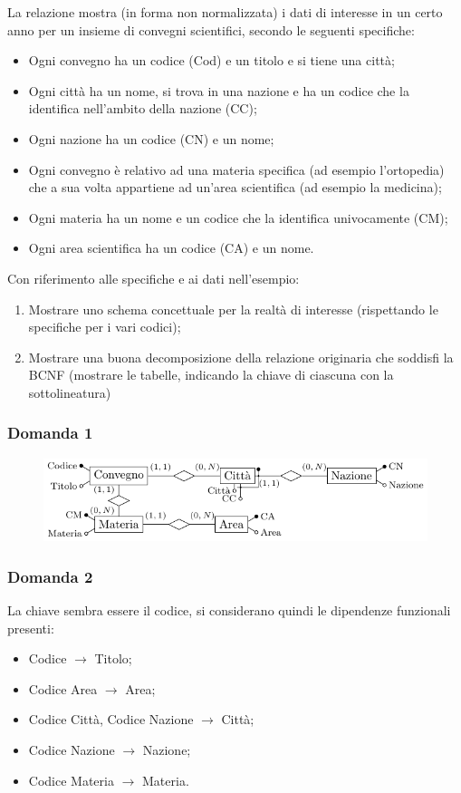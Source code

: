 \documentclass{article}
\numberwithin{equation}{subsection}
\begin{document}
La relazione mostra (in forma non normalizzata) i dati di interesse in un certo anno per un insieme di convegni
scientifici, secondo le seguenti specifiche:
\begin{itemize}
    \item Ogni convegno ha un codice (Cod) e un titolo e si tiene una città;
    \item Ogni città ha un nome, si trova in una nazione e ha un codice che la identifica nell'ambito della nazione (CC);
    \item Ogni nazione ha un codice (CN) e un nome;
    \item Ogni convegno è relativo ad una materia specifica (ad esempio l'ortopedia) che a sua volta appartiene
    ad un'area scientifica (ad esempio la medicina); 
    \item Ogni materia ha un nome e un codice che la identifica
    univocamente (CM);
    \item Ogni area scientifica ha un codice (CA) e un nome. 
\end{itemize}
Con riferimento alle specifiche e ai dati nell'esempio:
\begin{enumerate}
    \item Mostrare uno schema concettuale per la realtà di interesse (rispettando le specifiche per i vari codici);
    \item Mostrare una buona decomposizione della relazione originaria che soddisfi la BCNF (mostrare le tabelle, indicando la chiave di ciascuna con la sottolineatura)
\end{enumerate}

\subsubsection*{Domanda 1}

\begin{figure}[H]%
    \centering%
    \includegraphics[scale=1.1]{schema_13-12-24.pdf}%
\end{figure}

\subsubsection*{Domanda 2}
La chiave sembra essere il codice, si considerano quindi le dipendenze funzionali presenti:
\begin{itemize}
    \item Codice $\to$ Titolo;
    \item Codice Area $\to$ Area;
    \item Codice Città, Codice Nazione $\to$ Città;
    \item Codice Nazione $\to$ Nazione;
    \item Codice Materia $\to$ Materia.
\end{itemize}
\end{document}
